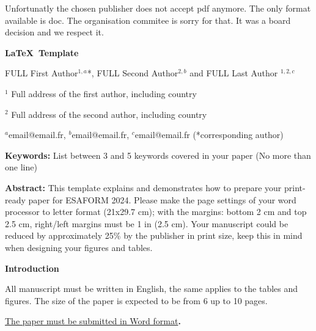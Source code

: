\documentclass[12pt,fleqn]{article}
\begin{document}
\begin{center} \Large
Unfortunatly the chosen publisher does not accept pdf anymore. The only format available is doc. The organisation commitee is sorry for that. It was a board decision and we respect it.

\vspace{0.2cm}
\textbf{\fontsize{16}{20}\selectfont\bfseries 
\LaTeX\ Template } 

\vspace{0.2cm}
{\fontsize{13}{15}\selectfont
FULL First Author$^{1,a}$*, FULL Second Author$^{2,b}$ and FULL Last Author $^{1,2,c}$ }


$^{1}$ Full address of the first author, including country

$^{2}$ Full address of the second author, including country


$^{a}$email@email.fr, $^{b}$email@email.fr, $^{c}$email@email.fr (*corresponding author) 

\end{center}
\noindent \textbf{Keywords:} List between 3 and 5 keywords covered in your paper (No more than one line) 



\noindent \textbf{Abstract:} This template explains and demonstrates how to prepare your print-ready paper for ESAFORM 2024. Please make the page settings of your word processor to letter format (21x29.7 cm); with the margins: bottom 2 cm and top 2.5 cm, right/left margins must be 1 in (2.5 cm). Your manuscript could be reduced by approximately 25\% by the publisher in print size, keep this in mind when designing your figures and tables.


\noindent \textbf{Introduction}

\noindent All manuscript must be written in English, the same applies to the tables and figures. The size of the paper is expected to be from 6 up to 10 pages.

\underline{The paper must be submitted in Word format}\textbf{.} %
\end{document}
